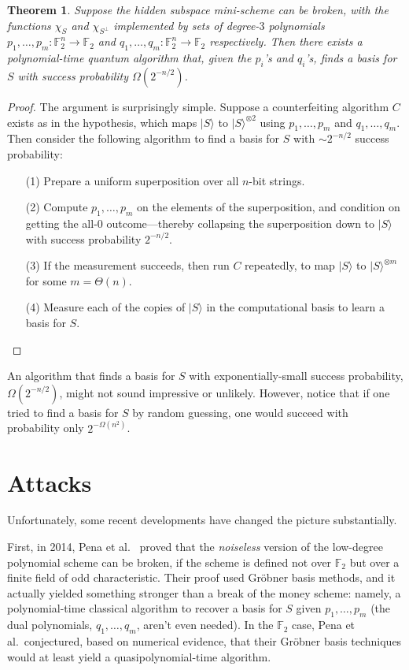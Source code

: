 \documentclass[11pt]{report}
\theoremstyle{plain}
\newtheorem{theorem}{Theorem}[section]
\theoremstyle{definition}
\renewcommand{\ket}[1]{|#1\rangle}
\begin{document}
\begin{theorem}
\label{secreduction}
Suppose the hidden subspace mini-scheme can be broken, with the functions $\chi_S$ and $\chi_{S^\perp}$ implemented by sets of degree-$3$ polynomials $p_1,\ldots,p_m: \mathbb F_2^n\to \mathbb F_2$ and $q_1,\ldots,q_m: \mathbb F_2^n\to \mathbb F_2$ respectively.  Then there exists a polynomial-time quantum algorithm that, given the $p_i$'s and $q_i$'s, finds a basis for $S$ with success probability $\Omega(2^{-n/2})$.
\end{theorem}
\begin{proof}
The argument is surprisingly simple.  Suppose a counterfeiting algorithm $C$ exists as in the hypothesis, which maps $\ket{S}$ to $\ket{S}^{\otimes 2}$ using $p_1,\ldots,p_m$ and $q_1,\ldots,q_m$.  Then consider the following algorithm to find a basis for $S$ with $\sim 2^{-n/2}$ success probability:
\begin{enumerate}
\item[(1)] Prepare a uniform superposition over all $n$-bit strings.
\item[(2)] Compute $p_1,\ldots,p_m$ on the elements of the superposition, and condition on getting the all-$0$ outcome---thereby collapsing the superposition down to $\ket{S}$ with success probability $2^{-n/2}$.
\item[(3)] If the measurement succeeds, then run $C$ repeatedly, to map $\ket{S}$ to $\ket{S}^{\otimes m}$ for some $m=\Theta(n)$.
\item[(4)] Measure each of the copies of $\ket{S}$ in the computational basis to learn a basis for $S$.
\end{enumerate}
\end{proof}

An algorithm that finds a basis for $S$ with exponentially-small success probability, $\Omega(2^{-n/2})$, might not sound impressive or unlikely.  However, notice that if one tried to find a basis for $S$ by random guessing, one would succeed with probability only $2^{-\Omega(n^2)}$.

\section{Attacks}

Unfortunately, some recent developments have changed the picture substantially.

First, in 2014, Pena et al.\ \cite{PFP15} proved that the {\em noiseless} version of the low-degree polynomial scheme can be broken, if the scheme is defined not over $\mathbb{F}_2$ but over a finite field of odd characteristic.  Their proof used Gr\"{o}bner basis methods, and it actually yielded something stronger than a break of the money scheme: namely, a polynomial-time classical algorithm to recover a basis for $S$ given $p_1,\ldots,p_m$ (the dual polynomials, $q_1,\ldots,q_m$, aren't even needed).  In the $\mathbb{F}_2$ case, Pena et al.\ conjectured, based on numerical evidence, that their Gr\"{o}bner basis techniques would at least yield a quasipolynomial-time algorithm.
\end{document}
